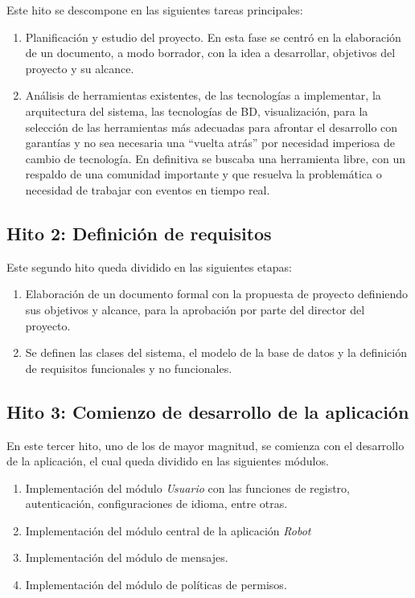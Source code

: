 Este hito se descompone en las siguientes tareas principales:

\begin{enumerate}
 \item Planificación y estudio del proyecto. En esta fase se centró en la elaboración de un documento, a modo borrador, con la idea a desarrollar, objetivos del proyecto y su alcance.
 \item Análisis de herramientas existentes, de las tecnologías a implementar, la arquitectura del sistema, las tecnologías de BD, visualización, para la selección de las herramientas más adecuadas 
 para afrontar el desarrollo con garantías y no sea necesaria una ``vuelta atrás'' por necesidad imperiosa de cambio de tecnología. En definitiva se buscaba una herramienta libre, con un respaldo de una comunidad importante
 y que resuelva la problemática o necesidad de trabajar con eventos en tiempo real.
\end{enumerate}

\subsection{Hito 2: Definición de requisitos }
\label{subsec:hito2}

Este segundo hito queda dividido en las siguientes etapas:

\begin{enumerate}
 \item Elaboración de un documento formal con la propuesta de proyecto definiendo sus objetivos y alcance, para la aprobación por parte del director del proyecto.
 \item Se definen las clases del sistema, el modelo de la base de datos y la definición de requisitos funcionales y no funcionales. 
\end{enumerate}

\subsection{Hito 3: Comienzo de desarrollo de la aplicación}
\label{subsec:hito3}

En este tercer hito, uno de los de mayor magnitud, se comienza con el desarrollo de la aplicación, el cual queda dividido en las siguientes módulos.

\begin{enumerate}
 \item Implementación del módulo \emph{Usuario} con las funciones de registro, autenticación, configuraciones de idioma, entre otras.
 \item Implementación del módulo central de la aplicación \emph{Robot}
 \item Implementación del módulo de mensajes.
 \item Implementación del módulo de políticas de permisos.
\end{enumerate}


